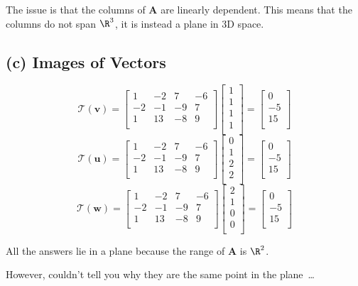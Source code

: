 \documentclass{article}
\begin{document}
The issue is that the columns of $ \mathbf{A} $ are linearly dependent. This
means that the columns do not span $ \R^{3} $, it is instead a plane in 3D
space.

\subsection{(c) Images of Vectors} 
\[%
    \mathcal{T}(\mathbf{v})=
    \begin{bmatrix}
        1 & -2 & 7 & -6 \\
		-2 & -1 & -9 & 7 \\
		1 & 13 & -8 & 9 \\
    \end{bmatrix}
    \begin{bmatrix}
        1 \\
		1 \\
		1 \\
		1 \\		
    \end{bmatrix}
    = 
    \begin{bmatrix}
        0 \\
		-5 \\
		15 \\		
    \end{bmatrix}
\]%
\[%
    \mathcal{T}(\mathbf{u})= 
    \begin{bmatrix}
        1 & -2 & 7 & -6 \\
		-2 & -1 & -9 & 7 \\
		1 & 13 & -8 & 9 \\
    \end{bmatrix}
    \begin{bmatrix}
        0 \\
		1 \\
		2 \\
		2 \\		
    \end{bmatrix}
    =
    \begin{bmatrix}
        0 \\
		-5 \\
		15 \\		
    \end{bmatrix}
\]%
\[%
    \mathcal{T}(\mathbf{w})=
    \begin{bmatrix}
        1 & -2 & 7 & -6 \\
		-2 & -1 & -9 & 7 \\
		1 & 13 & -8 & 9 \\
    \end{bmatrix}
    \begin{bmatrix}
        2 \\
		1 \\
		0 \\
		0 \\		
    \end{bmatrix}
    =
    \begin{bmatrix}
        0 \\
		-5 \\
		15 \\		
    \end{bmatrix}
\]%

All the answers lie in a plane because the range of $ \mathbf{A} $ is $ \R^{2}
$. 

However, couldn't tell you why they are the same point in the plane\ \ldots \
\end{document}

